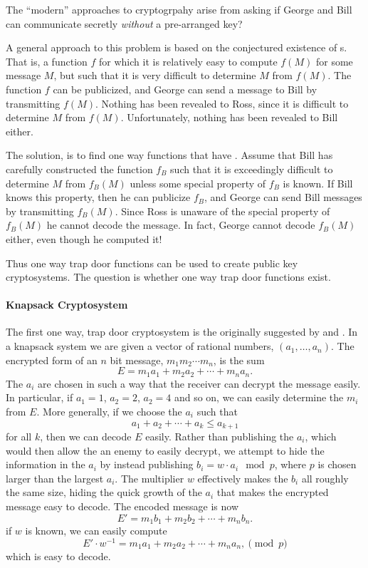 The ``modern'' approaches to cryptogrpahy arise from asking if George
and Bill can communicate secretly {\em without} a pre-arranged key?

A general approach to this problem is based on the conjectured
existence of s.  That is, a function $f$ for
which it is relatively easy to compute $f(M)$ for some message $M$,
but such that it is very difficult to determine $M$ from $f(M)$.  The
function $f$ can be publicized, and George can send a message to Bill
by transmitting $f(M)$.  Nothing has been revealed to Ross, since it
is difficult to determine $M$ from $f(M)$.  Unfortunately, nothing has
been revealed to Bill either.

The solution, is to find one way functions that have .
Assume that Bill has carefully constructed the function $f_B$ such
that it is exceedingly difficult to determine $M$ from $f_B(M)$ unless
some special property of $f_B$ is known.  If Bill knows this property,
then he can publicize $f_B$, and George can send Bill messages by
transmitting $f_B(M)$.  Since Ross is unaware of the special property
of $f_B(M)$ he cannot decode the message.  In fact, George cannot decode
$f_B(M)$ either, even though he computed it!

Thus one way trap door functions can be used to create public key
cryptosystems.  The question is whether one way trap door functions exist.  


\paragraph{Knapsack Cryptosystem}

The first one way, trap door cryptosystem is the  originally suggested by {\Merkle} and {\Hellman}
\cite{Merkle:Hellman}.  In a knapsack system we are given a vector of
rational numbers, $(a_1, \ldots, a_n)$.  The encrypted form of an $n$
bit message, $m_1 m_2 \cdots m_n$, is the sum
\[
E = m_1 a_1 + m_2 a_2 + \cdots + m_n a_n.
\]
The $a_i$ are chosen in such a way that the receiver can decrypt the
message easily.  In particular, if $a_1 = 1$, $a_2 = 2$, $a_2 = 4$ and
so on, we can easily determine the $m_i$ from $E$.  More generally, if
we choose the $a_i$ such that 
\[
a_1 + a_2 + \cdots + a_k \le a_{k+1}
\]
for all $k$, then we can decode $E$ easily.  Rather than publishing the
$a_i$, which would then allow the an enemy to easily decrypt, we attempt
to hide the information in the $a_i$ by instead publishing
$b_i =  w \cdot a_i \mod{p}$, where $p$ is chosen larger than the
largest $a_i$.  The multiplier $w$ effectively makes the $b_i$ all
roughly the same size, hiding the quick growth of the $a_i$ that makes
the encrypted message easy to decode.  The encoded message is now
\[
E' = m_1 b_1 + m_2 b_2 + \cdots + m_n b_n.
\]
if $w$ is known, we can easily compute
\[
E' \cdot w^{-1} = m_1 a_1 + m_2 a_2 + \cdots + m_n a_n,
\pmod{p}
\]
which is easy to decode.

